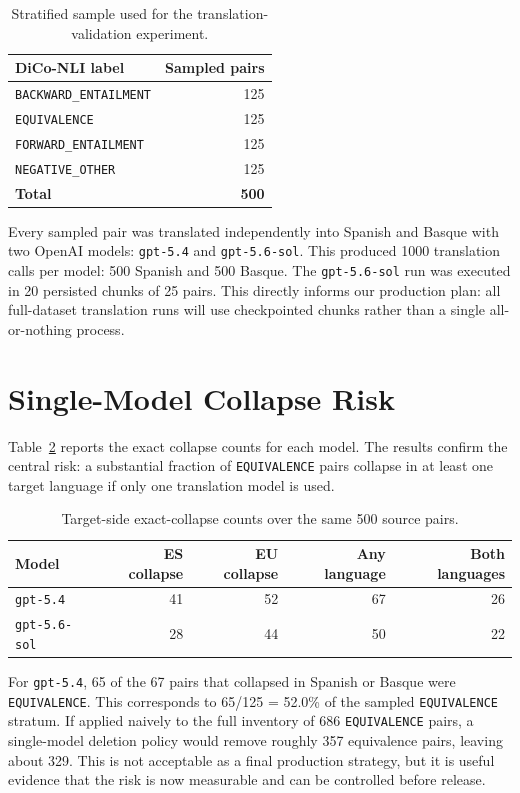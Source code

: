\documentclass[10pt]{article}
\begin{document}
\begin{table}[h]
\centering
\small
\begin{tabular}{lr}
\toprule
DiCo-NLI label & Sampled pairs \\
\midrule
\texttt{BACKWARD\_ENTAILMENT} & 125 \\
\texttt{EQUIVALENCE} & 125 \\
\texttt{FORWARD\_ENTAILMENT} & 125 \\
\texttt{NEGATIVE\_OTHER} & 125 \\
\midrule
\textbf{Total} & \textbf{500} \\
\bottomrule
\end{tabular}
\caption{Stratified sample used for the translation-validation experiment.}
\label{tab:sample}
\end{table}

Every sampled pair was translated independently into Spanish and Basque with
two OpenAI models: \texttt{gpt-5.4} and \texttt{gpt-5.6-sol}.  This produced
1000 translation calls per model: 500 Spanish and 500 Basque.  The
\texttt{gpt-5.6-sol} run was executed in 20 persisted chunks of 25 pairs.  This
directly informs our production plan: all full-dataset translation runs will use
checkpointed chunks rather than a single all-or-nothing process.

\section{Single-Model Collapse Risk}

Table~\ref{tab:collapse-single} reports the exact collapse counts for each
model.  The results confirm the central risk: a substantial fraction of
\texttt{EQUIVALENCE} pairs collapse in at least one target language if only one
translation model is used.

\begin{table}[h]
\centering
\small
\begin{tabular}{lrrrr}
\toprule
Model & ES collapse & EU collapse & Any language & Both languages \\
\midrule
\texttt{gpt-5.4} & 41 & 52 & 67 & 26 \\
\texttt{gpt-5.6-sol} & 28 & 44 & 50 & 22 \\
\bottomrule
\end{tabular}
\caption{Target-side exact-collapse counts over the same 500 source pairs.}
\label{tab:collapse-single}
\end{table}

For \texttt{gpt-5.4}, 65 of the 67 pairs that collapsed in Spanish or Basque
were \texttt{EQUIVALENCE}.  This corresponds to 65/125 = 52.0\% of the sampled
\texttt{EQUIVALENCE} stratum.  If applied naively to the full inventory of 686
\texttt{EQUIVALENCE} pairs, a single-model deletion policy would remove roughly
357 equivalence pairs, leaving about 329.  This is not acceptable as a final
production strategy, but it is useful evidence that the risk is now measurable
and can be controlled before release.
\end{document}
